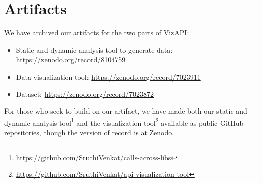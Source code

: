 \section{Artifacts}
\label{sec:artifacts}
We have archived our artifacts for the two parts of VizAPI:
\begin{itemize}
\item Static and dynamic analysis tool to generate data: \url{https://zenodo.org/record/8104759}
\item Data visualization tool: \url{https://zenodo.org/record/7023911}
\item Dataset: \url{https://zenodo.org/record/7023872}
\end{itemize}
For those who seek to build on our artifact, we have made both
our static and dynamic analysis tool\footnote{\url{https://github.com/SruthiVenkat/calls-across-libs}}
and the visualization tool\footnote{\url{https://github.com/SruthiVenkat/api-visualization-tool}}
available as public GitHub repositories, though the version of record is at Zenodo.
